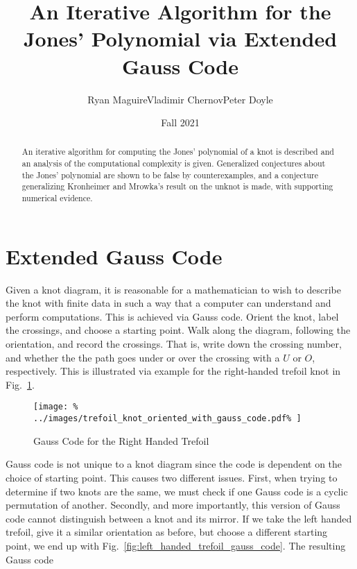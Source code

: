 \documentclass{article}
\title{An Iterative Algorithm for the Jones' Polynomial via Extended Gauss Code}
\author{Ryan Maguire\hspace{2em}Vladimir Chernov\hspace{2em}Peter Doyle}
\date{Fall 2021}
\theoremstyle{plain}
\begin{document}
    \maketitle
    \tableofcontents
    \begin{abstract}
        \noindent
        An iterative algorithm for computing the Jones' polynomial of a knot
        is described and an analysis of the computational complexity is given.
        Generalized conjectures about the Jones' polynomial are shown to be
        false by counterexamples, and a conjecture generalizing Kronheimer and
        Mrowka's result on the unknot is made, with supporting numerical
        evidence.
    \end{abstract}
    \section{Extended Gauss Code}
        Given a knot diagram, it is reasonable for a mathematician to wish to
        describe the knot with finite data in such a way that a computer can
        understand and perform computations. This is achieved via Gauss code.
        Orient the knot, label the crossings, and choose a starting point.
        Walk along the diagram, following the orientation, and record the
        crossings. That is, write down the crossing number, and whether the
        the path goes under or over the crossing with a $U$ or $O$,
        respectively. This is illustrated via example for the right-handed
        trefoil knot in Fig.~\ref{fig:right_handed_trefoil_gauss_code}.
        \begin{figure}
            \centering
            \texttt{[image: \%
                ../images/trefoil\_knot\_oriented\_with\_gauss\_code.pdf\%
            ]}
            \caption{Gauss Code for the Right Handed Trefoil}
            \label{fig:right_handed_trefoil_gauss_code}
        \end{figure}
        Gauss code is not unique to a knot diagram since the code is dependent
        on the choice of starting point. This causes two different issues.
        First, when trying to determine if two knots are the same, we must
        check if one Gauss code is a cyclic permutation of another. Secondly,
        and more importantly, this version of Gauss code cannot distinguish
        between a knot and its mirror. If we take the left handed trefoil,
        give it a similar orientation as before, but choose a different
        starting point, we end up with
        Fig.~\ref{fig:left_handed_trefoil_gauss_code}. The resulting Gauss code
\end{document}
